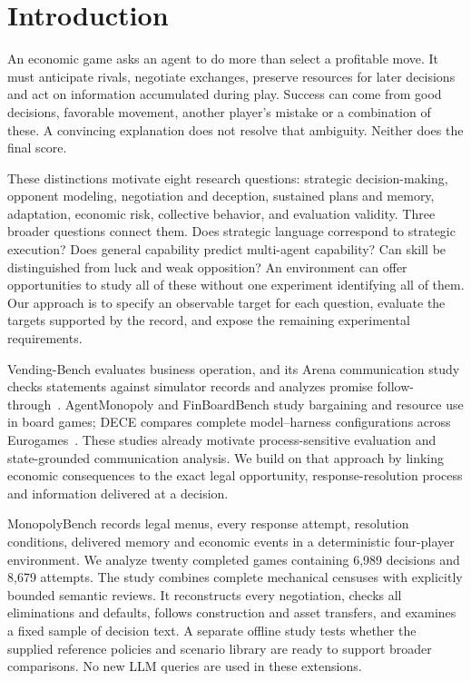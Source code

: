 \section{Introduction}

An economic game asks an agent to do more than select a profitable move. It must anticipate rivals, negotiate exchanges, preserve resources for later decisions and act on information accumulated during play. Success can come from good decisions, favorable movement, another player's mistake or a combination of these. A convincing explanation does not resolve that ambiguity. Neither does the final score.

These distinctions motivate eight research questions: strategic decision-making, opponent modeling, negotiation and deception, sustained plans and memory, adaptation, economic risk, collective behavior, and evaluation validity. Three broader questions connect them. Does strategic language correspond to strategic execution? Does general capability predict multi-agent capability? Can skill be distinguished from luck and weak opposition? An environment can offer opportunities to study all of these without one experiment identifying all of them. Our approach is to specify an observable target for each question, evaluate the targets supported by the record, and expose the remaining experimental requirements.

Vending-Bench evaluates business operation, and its Arena communication study checks statements against simulator records and analyzes promise follow-through~\cite{backlund2025vendingbench,li2026arena}. AgentMonopoly and FinBoardBench study bargaining and resource use in board games; DECE compares complete model--harness configurations across Eurogames~\cite{wu2026agentmonopoly,hu2026finboardbench,zhang2026dece}. These studies already motivate process-sensitive evaluation and state-grounded communication analysis. We build on that approach by linking economic consequences to the exact legal opportunity, response-resolution process and information delivered at a decision.

MonopolyBench records legal menus, every response attempt, resolution conditions, delivered memory and economic events in a deterministic four-player environment. We analyze twenty completed games containing 6,989 decisions and 8,679 attempts. The study combines complete mechanical censuses with explicitly bounded semantic reviews. It reconstructs every negotiation, checks all eliminations and defaults, follows construction and asset transfers, and examines a fixed sample of decision text. A separate offline study tests whether the supplied reference policies and scenario library are ready to support broader comparisons. No new LLM queries are used in these extensions.

